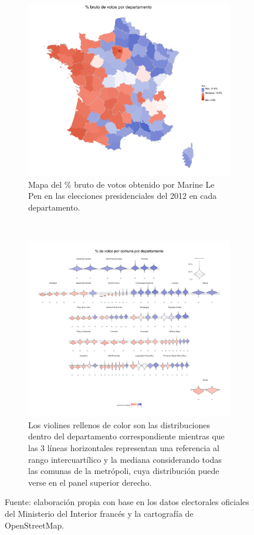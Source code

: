 \begin{figure}[h]
	\centering
	\begin{subfigure}{0.4\textwidth}
	\includegraphics[width = \textwidth]{Figs/AED/Mapa_Dptos_Br_P12_FN}
	\caption{Mapa del \% bruto de votos obtenido por Marine Le Pen en las elecciones presidenciales del 2012 en cada departamento.}
	\label{fig:Pct_Br_Dptos_P12}	
	\end{subfigure}
	~
	\begin{subfigure}{0.5\textwidth}
	\includegraphics[width = \textwidth]{Figs/AED/Geofacet_Dpto_P12_FN}
	\caption{Los violines rellenos de color son las distribuciones dentro del departamento correspondiente mientras que las 3 líneas horizontales representan una referencia al rango intercuartílico y la mediana considerando todas las comunas de la metrópoli, cuya distribución puede verse en el panel superior derecho.}
	\label{fig:Geofacet_Distr_Dptos_P12}	
	\end{subfigure}
	\caption{Fuente: elaboración propia con base en los datos electorales oficiales del Ministerio del Interior francés y la cartografía de OpenStreetMap.}
\end{figure}

